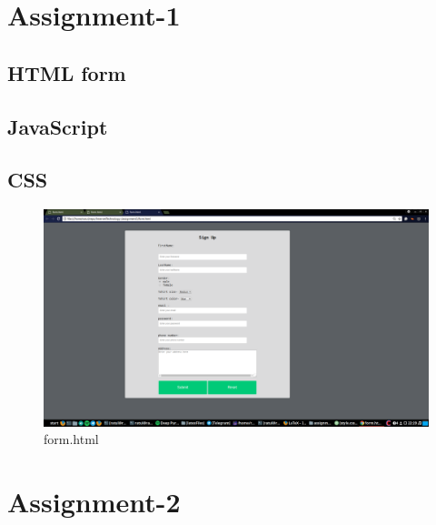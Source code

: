 \documentclass[a4paper,16pt]{article}
\begin{document}
	{
		{
			\renewcommand\contentsname{\Huge Contents}
			\renewcommand\cftsecfont{\LARGE}
			\renewcommand\cftsubsecfont{\Large}
			\doublespacing
			\doublespacing
			\doublespacing
			\tableofcontents
			\singlespacing
		}
	}
	\newpage
	\section{Assignment-1}
	\subsection{HTML form}
	\vspace{0.2in}
	
	\subsection{JavaScript}
	
	\subsection{CSS}
	
	\begin{figure}[h!]
		\includegraphics*[scale=0.25,width=1\linewidth]{code/form.png}
		\caption{\large form.html}
	\end{figure}
	\clearpage
	\section{Assignment-2}
\end{document}
